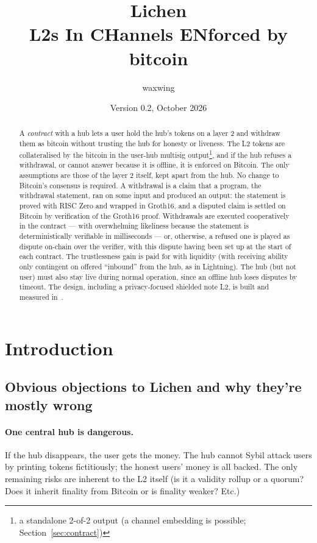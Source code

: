 \documentclass[11pt]{article}
\title{\textbf{Lichen}\\L2s In CHannels ENforced by bitcoin}
\author{waxwing}
\date{Version 0.2, October 2026}
\begin{document}
\maketitle

\begin{abstract}
A \emph{contract} with a hub lets a user hold the hub's tokens on a layer 2 and
withdraw them as bitcoin without trusting the hub for honesty or liveness. The L2 tokens are collateralised by the bitcoin in the user-hub multisig output\footnote{a standalone 2-of-2 output (a channel embedding is possible; Section~\ref{sec:contract})}, and if the hub refuses a withdrawal, or cannot answer because it is offline, it is enforced on Bitcoin. The only assumptions are those of the layer 2 itself, kept apart from the hub. No change to Bitcoin's
consensus is required. A withdrawal is a claim that a program, the withdrawal statement, ran on some input and produced an output: the statement is proved with RISC Zero and wrapped in Groth16, and a disputed claim is settled on Bitcoin by verification of the Groth16 proof.  Withdrawals are executed cooperatively in the contract --- with overwhelming likeliness because the statement is deterministically verifiable in milliseconds --- or, otherwise, a refused one is played as dispute on-chain over the verifier, with this dispute having been set up at the start of each contract. The trustlessness gain is paid for with liquidity (with receiving ability only contingent on offered ``inbound'' from the hub, as in Lightning). The hub (but not user) must also stay live during normal operation, since an offline hub loses disputes by timeout. The design, including a privacy-focused shielded note L2, is built and measured in~\cite{lichencode}.
\end{abstract}

\tableofcontents

\section{Introduction}

\subsection{Obvious objections to Lichen and why they're mostly wrong}

\paragraph{One central hub is dangerous.} If the hub disappears, the user gets the money. The hub cannot Sybil attack users by printing tokens fictitiously; the honest users' money is all backed. The only remaining risks are inherent to the L2 itself (is it a validity rollup or a quorum? Does it inherit finality from Bitcoin or is finality weaker? Etc.)
\end{document}
